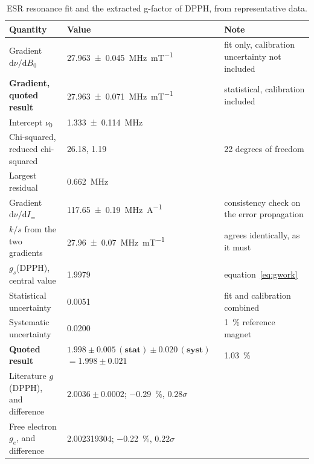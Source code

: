 \documentclass[11pt,a4paper]{article}
\begin{document}
\begin{table}[htbp]
\centering
\caption{ESR resonance fit and the extracted g-factor of DPPH, from representative data.}
\label{tab:esrfit}
\footnotesize
\begin{tabular}{@{}L{4.8cm}L{7.4cm}L{3.5cm}@{}}
\toprule
Quantity & Value & Note \\
\midrule
Gradient $\mathrm{d}\nu/\mathrm{d}B_0$ & \SI{27.963 \pm 0.045}{\mega\hertz\per\milli\tesla} & fit only, calibration uncertainty not included \\
\textbf{Gradient, quoted result} & \SI{27.963 \pm 0.071}{\mega\hertz\per\milli\tesla} & statistical, calibration included \\
Intercept $\nu_0$ & \SI{1.333 \pm 0.114}{\mega\hertz} & \\
Chi-squared, reduced chi-squared & 26.18, 1.19 & 22 degrees of freedom \\
Largest residual & \SI{0.662}{\mega\hertz} & \\
Gradient $\mathrm{d}\nu/\mathrm{d}I_=$ & \SI{117.65 \pm 0.19}{\mega\hertz\per\ampere} & consistency check on the error propagation \\
$k/s$ from the two gradients & \SI{27.96 \pm 0.07}{\mega\hertz\per\milli\tesla} & agrees identically, as it must \\
\midrule
$g_s$(DPPH), central value & 1.9979 & equation~\eqref{eq:gwork} \\
Statistical uncertainty & 0.0051 & fit and calibration combined \\
Systematic uncertainty & 0.0200 & \SI{1}{\percent} reference magnet \\
\textbf{Quoted result} & $\mathbf{1.998 \pm 0.005\,(\text{stat}) \pm 0.020\,(\text{syst})}$ \newline $\mathbf{= 1.998 \pm 0.021}$ & \SI{1.03}{\percent} \\
\midrule
Literature $g$(DPPH), and difference & $2.0036 \pm 0.0002$; \SI{-0.29}{\percent}, $0.28\sigma$ & \cite{krzystek} \\
Free electron $g_e$, and difference & 2.002319304; \SI{-0.22}{\percent}, $0.22\sigma$ & \cite{codata} \\
\bottomrule
\end{tabular}
\end{table}
\end{document}

